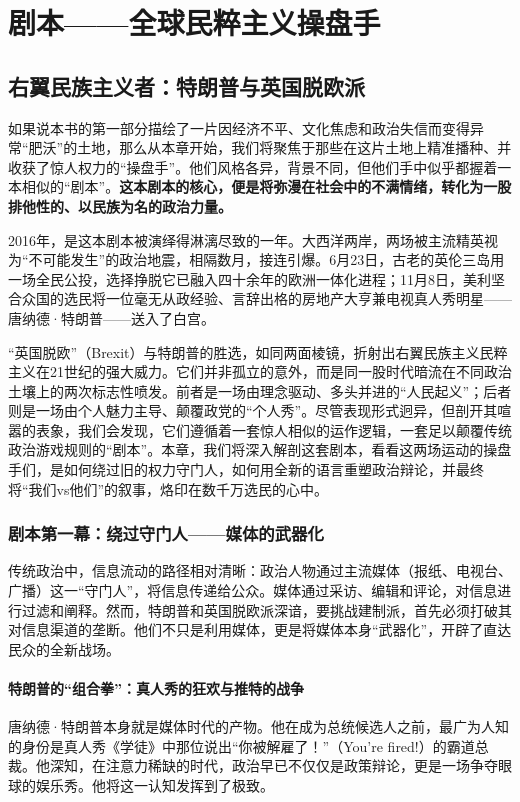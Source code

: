 \part{剧本——全球民粹主义操盘手}
\chapter{右翼民族主义者：特朗普与英国脱欧派}

如果说本书的第一部分描绘了一片因经济不平、文化焦虑和政治失信而变得异常“肥沃”的土地，那么从本章开始，我们将聚焦于那些在这片土地上精准播种、并收获了惊人权力的“操盘手”。他们风格各异，背景不同，但他们手中似乎都握着一本相似的“剧本”。\textbf{这本剧本的核心，便是将弥漫在社会中的不满情绪，转化为一股排他性的、以民族为名的政治力量。}

2016年，是这本剧本被演绎得淋漓尽致的一年。大西洋两岸，两场被主流精英视为“不可能发生”的政治地震，相隔数月，接连引爆。6月23日，古老的英伦三岛用一场全民公投，选择挣脱它已融入四十余年的欧洲一体化进程；11月8日，美利坚合众国的选民将一位毫无从政经验、言辞出格的房地产大亨兼电视真人秀明星——唐纳德·特朗普——送入了白宫。

“英国脱欧”（Brexit）与特朗普的胜选，如同两面棱镜，折射出右翼民族主义民粹主义在21世纪的强大威力。它们并非孤立的意外，而是同一股时代暗流在不同政治土壤上的两次标志性喷发。前者是一场由理念驱动、多头并进的“人民起义”；后者则是一场由个人魅力主导、颠覆政党的“个人秀”。尽管表现形式迥异，但剖开其喧嚣的表象，我们会发现，它们遵循着一套惊人相似的运作逻辑，一套足以颠覆传统政治游戏规则的“剧本”。本章，我们将深入解剖这套剧本，看看这两场运动的操盘手们，是如何绕过旧的权力守门人，如何用全新的语言重塑政治辩论，并最终将“我们vs他们”的叙事，烙印在数千万选民的心中。

\section{剧本第一幕：绕过守门人——媒体的武器化}

传统政治中，信息流动的路径相对清晰：政治人物通过主流媒体（报纸、电视台、广播）这一“守门人”，将信息传递给公众。媒体通过采访、编辑和评论，对信息进行过滤和阐释。然而，特朗普和英国脱欧派深谙，要挑战建制派，首先必须打破其对信息渠道的垄断。他们不只是利用媒体，更是将媒体本身“武器化”，开辟了直达民众的全新战场。

\subsection{特朗普的“组合拳”：真人秀的狂欢与推特的战争}

唐纳德·特朗普本身就是媒体时代的产物。他在成为总统候选人之前，最广为人知的身份是真人秀《学徒》中那位说出“你被解雇了！”（You're fired!）的霸道总裁。他深知，在注意力稀缺的时代，政治早已不仅仅是政策辩论，更是一场争夺眼球的娱乐秀。他将这一认知发挥到了极致。

